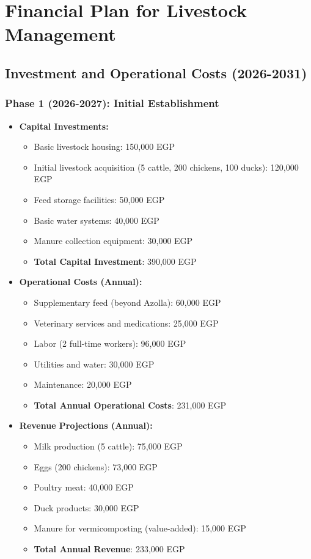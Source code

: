 \section{Financial Plan for Livestock Management}

\subsection{Investment and Operational Costs (2026-2031)}

\subsubsection{Phase 1 (2026-2027): Initial Establishment}
\begin{itemize}
    \item \textbf{Capital Investments:}
    \begin{itemize}
        \item Basic livestock housing: 150,000 EGP
        \item Initial livestock acquisition (5 cattle, 200 chickens, 100 ducks): 120,000 EGP
        \item Feed storage facilities: 50,000 EGP
        \item Basic water systems: 40,000 EGP
        \item Manure collection equipment: 30,000 EGP
        \item \textbf{Total Capital Investment}: 390,000 EGP
    \end{itemize}
    
    \item \textbf{Operational Costs (Annual):}
    \begin{itemize}
        \item Supplementary feed (beyond Azolla): 60,000 EGP
        \item Veterinary services and medications: 25,000 EGP
        \item Labor (2 full-time workers): 96,000 EGP
        \item Utilities and water: 30,000 EGP
        \item Maintenance: 20,000 EGP
        \item \textbf{Total Annual Operational Costs}: 231,000 EGP
    \end{itemize}
    
    \item \textbf{Revenue Projections (Annual):}
    \begin{itemize}
        \item Milk production (5 cattle): 75,000 EGP
        \item Eggs (200 chickens): 73,000 EGP
        \item Poultry meat: 40,000 EGP
        \item Duck products: 30,000 EGP
        \item Manure for vermicomposting (value-added): 15,000 EGP
        \item \textbf{Total Annual Revenue}: 233,000 EGP
    \end{itemize}
    

\end{itemize}
